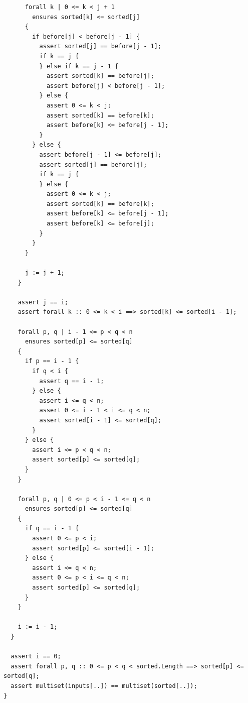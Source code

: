 \documentclass{article}
\begin{document}
\begin{lstlisting}
      forall k | 0 <= k < j + 1
        ensures sorted[k] <= sorted[j]
      {
        if before[j] < before[j - 1] {
          assert sorted[j] == before[j - 1];
          if k == j {
          } else if k == j - 1 {
            assert sorted[k] == before[j];
            assert before[j] < before[j - 1];
          } else {
            assert 0 <= k < j;
            assert sorted[k] == before[k];
            assert before[k] <= before[j - 1];
          }
        } else {
          assert before[j - 1] <= before[j];
          assert sorted[j] == before[j];
          if k == j {
          } else {
            assert 0 <= k < j;
            assert sorted[k] == before[k];
            assert before[k] <= before[j - 1];
            assert before[k] <= before[j];
          }
        }
      }

      j := j + 1;
    }

    assert j == i;
    assert forall k :: 0 <= k < i ==> sorted[k] <= sorted[i - 1];

    forall p, q | i - 1 <= p < q < n
      ensures sorted[p] <= sorted[q]
    {
      if p == i - 1 {
        if q < i {
          assert q == i - 1;
        } else {
          assert i <= q < n;
          assert 0 <= i - 1 < i <= q < n;
          assert sorted[i - 1] <= sorted[q];
        }
      } else {
        assert i <= p < q < n;
        assert sorted[p] <= sorted[q];
      }
    }

    forall p, q | 0 <= p < i - 1 <= q < n
      ensures sorted[p] <= sorted[q]
    {
      if q == i - 1 {
        assert 0 <= p < i;
        assert sorted[p] <= sorted[i - 1];
      } else {
        assert i <= q < n;
        assert 0 <= p < i <= q < n;
        assert sorted[p] <= sorted[q];
      }
    }

    i := i - 1;
  }

  assert i == 0;
  assert forall p, q :: 0 <= p < q < sorted.Length ==> sorted[p] <= sorted[q];
  assert multiset(inputs[..]) == multiset(sorted[..]);
}
\end{lstlisting}
\end{document}
